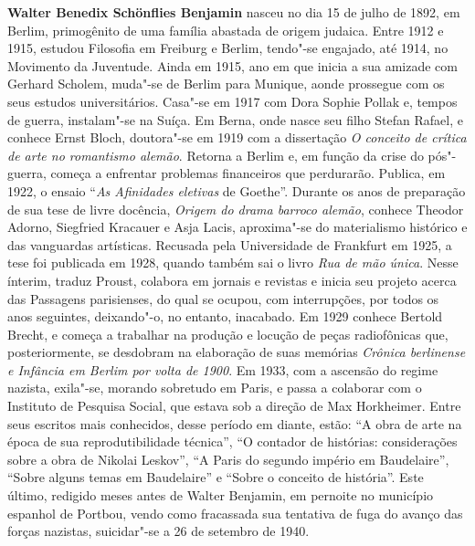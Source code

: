 
\textbf{Walter Benedix Schönflies Benjamin} nasceu no dia 15 de julho de 1892, em Berlim,
primogênito de uma família abastada de origem judaica. Entre 1912 e 1915, estudou Filosofia
em Freiburg e Berlim, tendo"-se engajado, até 1914, no Movimento da Juventude. Ainda em
1915, ano em que inicia a sua amizade com Gerhard Scholem, muda"-se de Berlim para
Munique, aonde prossegue com os seus estudos universitários. Casa"-se em 1917 com Dora
Sophie Pollak e, tempos de guerra, instalam"-se na Suíça. Em Berna, onde nasce seu filho Stefan
Rafael, e conhece Ernst Bloch, doutora"-se em 1919 com a dissertação \emph{O conceito de crítica de
arte no romantismo alemão}. Retorna a Berlim e, em função da crise do pós"-guerra, começa a
enfrentar problemas financeiros que perdurarão. Publica, em 1922, o ensaio ``\emph{As Afinidades
eletivas} de Goethe''. Durante os anos de preparação de sua tese de livre docência, \emph{Origem do
drama barroco alemão}, conhece Theodor Adorno, Siegfried Kracauer e Asja Lacis, aproxima"-se do materialismo histórico e das vanguardas artísticas. Recusada pela Universidade de
Frankfurt em 1925, a tese foi publicada em 1928, quando também sai o livro \emph{Rua de mão única}.
Nesse ínterim, traduz Proust, colabora em jornais e revistas e inicia seu projeto acerca das
Passagens parisienses, do qual se ocupou, com interrupções, por todos os anos seguintes,
deixando"-o, no entanto, inacabado. Em 1929 conhece Bertold Brecht, e começa a trabalhar na
produção e locução de peças radiofônicas que, posteriormente, se desdobram na elaboração de
suas memórias \emph{Crônica berlinense e Infância em Berlim por volta de 1900}. Em 1933, com a
ascensão do regime nazista, exila"-se, morando sobretudo em Paris, e passa a colaborar com o
Instituto de Pesquisa Social, que estava sob a direção de Max Horkheimer. Entre seus escritos
mais conhecidos, desse período em diante, estão: ``A obra de arte na época de sua
reprodutibilidade técnica'', ``O contador de histórias: considerações sobre a obra de Nikolai
Leskov'', ``A Paris do segundo império em Baudelaire'', ``Sobre alguns temas em Baudelaire'' e
``Sobre o conceito de história''. Este último, redigido meses antes de Walter Benjamin, em
pernoite no município espanhol de Portbou, vendo como fracassada sua tentativa de fuga do
avanço das forças nazistas, suicidar"-se a 26 de setembro de 1940.



